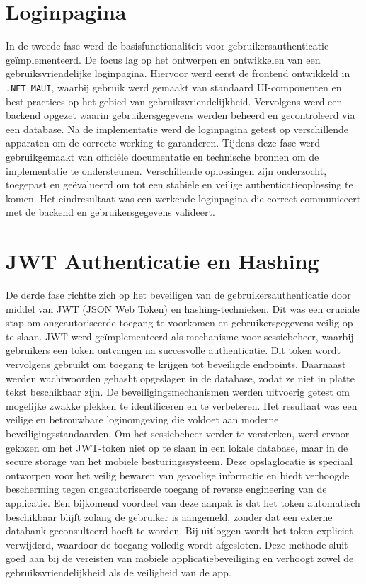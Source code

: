 \section{Loginpagina}

In de tweede fase werd de basisfunctionaliteit voor gebruikersauthenticatie geïmplementeerd. De focus lag op het ontwerpen en ontwikkelen van een gebruiksvriendelijke loginpagina. Hiervoor werd eerst de frontend ontwikkeld in \texttt{.NET MAUI}, waarbij gebruik werd gemaakt van standaard UI-componenten en best practices op het gebied van gebruiksvriendelijkheid. Vervolgens werd een backend opgezet waarin gebruikersgegevens werden beheerd en gecontroleerd via een database. Na de implementatie werd de loginpagina getest op verschillende apparaten om de correcte werking te garanderen. Tijdens deze fase werd gebruikgemaakt van officiële documentatie en technische bronnen om de implementatie te ondersteunen. Verschillende oplossingen zijn onderzocht, toegepast en geëvalueerd om tot een stabiele en veilige authenticatieoplossing te komen. Het eindresultaat was een werkende loginpagina die correct communiceert met de backend en gebruikersgegevens valideert.

\section{JWT Authenticatie en Hashing}

De derde fase richtte zich op het beveiligen van de gebruikersauthenticatie door middel van JWT (JSON Web Token) en hashing-technieken. Dit was een cruciale stap om ongeautoriseerde toegang te voorkomen en gebruikersgegevens veilig op te slaan. JWT werd geïmplementeerd als mechanisme voor sessiebeheer, waarbij gebruikers een token ontvangen na succesvolle authenticatie. Dit token wordt vervolgens gebruikt om toegang te krijgen tot beveiligde endpoints. Daarnaast werden wachtwoorden gehasht opgeslagen in de database, zodat ze niet in platte tekst beschikbaar zijn. De beveiligingsmechanismen werden uitvoerig getest om mogelijke zwakke plekken te identificeren en te verbeteren. Het resultaat was een veilige en betrouwbare loginomgeving die voldoet aan moderne beveiligingsstandaarden.
Om het sessiebeheer verder te versterken, werd ervoor gekozen om het JWT-token niet op te slaan in een lokale database, maar in de secure storage van het mobiele besturingssysteem. Deze opslaglocatie is speciaal ontworpen voor het veilig bewaren van gevoelige informatie en biedt verhoogde bescherming tegen ongeautoriseerde toegang of reverse engineering van de applicatie. Een bijkomend voordeel van deze aanpak is dat het token automatisch beschikbaar blijft zolang de gebruiker is aangemeld, zonder dat een externe databank geconsulteerd hoeft te worden. Bij uitloggen wordt het token expliciet verwijderd, waardoor de toegang volledig wordt afgesloten. Deze methode sluit goed aan bij de vereisten van mobiele applicatiebeveiliging en verhoogt zowel de gebruiksvriendelijkheid als de veiligheid van de app.


